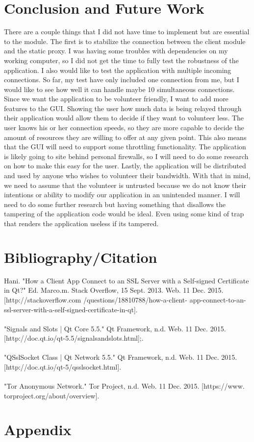 \documentclass[12pt,a4paper]{report}
\begin{document}
\chapter{Conclusion and Future Work}
There are a couple things that I did not have time to implement but are essential to the module. The  first is to stabilize the connection between the client module and the static proxy. I was having some troubles with dependencies on my working computer, so I did not get the time to fully test the robustness of the application. I also would like to test the application with multiple incoming connections. So far, my test have only included one connection from me, but I would like to see how well it can handle maybe 10 simultaneous connections. Since we want the application to be volunteer friendly, I want to add more features to the GUI. Showing the user how much data is being relayed through their application would allow them to decide if they want to volunteer less. The user knows his or her connection speeds, so they are more capable to decide the amount of resources they are willing to offer at any given point. This also means that the GUI will need to support some throttling functionality. The application is likely going to site behind personal firewalls, so I will need to do some research on how to make this easy for the user. Lastly, the application will be distributed and used by anyone who wishes to volunteer their bandwidth. With that in mind, we need to assume that the volunteer is untrusted because we do not know their intentions or ability to modify our application in an unintended manner. I will need to do some further research but having something that disallows the tampering of the application code would be ideal. Even using some kind of trap that renders the application useless if its tampered. 
\chapter{Bibliography/Citation}

Hani. "How a Client App Connect to an SSL Server with a Self-signed Certificate in Qt?" Ed. Marco.m. Stack Overflow, 15 Sept. 2013. Web. 11 Dec. 2015. [http://stackoverflow.com
/questions/18810788/how-a-client-
app-connect-to-an-ssl-server-with-a-self-signed-certificate-in-qt].
\\\\
"Signals and Slots | Qt Core 5.5." Qt Framework, n.d. Web. 11 Dec. 2015. 
[http://doc.qt.io/qt-5.5/signalsandslots.html];.
\\\\
"QSslSocket Class | Qt Network 5.5." Qt Framework, n.d. Web. 11 Dec. 2015. [http://doc.qt.io/qt-5/qsslsocket.html].
\\\\
"Tor Anonymous Network." Tor Project, n.d. Web. 11 Dec. 2015.
[https://www.
torproject.org/about/overview].


\chapter{Appendix} 
 
 
 
\end{document}
